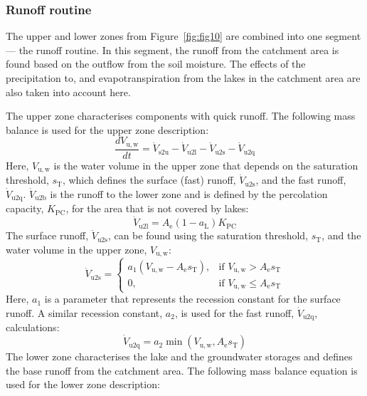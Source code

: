 \documentclass[%
]{USN-PhD}
\begin{document}
\subsubsection{Runoff routine}

The upper and lower zones from Figure~\ref{fig:fig10} are combined into one segment --- the runoff routine. In this segment, the runoff from the catchment area is found based on the outflow from the soil moisture. The effects of the precipitation to, and evapotranspiration from the lakes in the catchment area are also taken into account here.

The upper zone characterises components with quick runoff. The following mass balance is used for the upper zone description:
\begin{equation}\label{eq:eq28}
\frac{dV_\mathrm{u,w}}{dt}=\dot{V}_\mathrm{s2u}-\dot{V}_\mathrm{u2l}-\dot{V}_\mathrm{u2s}-\dot{V}_\mathrm{u2q}
\end{equation}
Here, $V_\mathrm{u,w}$ is the water volume in the upper zone that depends on the saturation threshold, $s_\mathrm{T}$, which defines the surface (fast) runoff, $\dot{V}_\mathrm{u2s}$, and the fast runoff, $\dot{V}_\mathrm{u2q}$. $\dot{V}_\mathrm{u2b}$ is the runoff to the lower zone and is defined by the percolation capacity, $K_\mathrm{PC}$, for the area that is not covered by lakes:
\begin{equation}\label{eq:eq29}
\dot{V}_\mathrm{u2l}=A_\mathrm{e}(1-a_\mathrm{L})K_\mathrm{PC}
\end{equation}
The surface runoff, $\dot{V}_\mathrm{u2s}$, can be found using the saturation threshold, $s_\mathrm{T}$, and the water volume in the upper zone, $V_\mathrm{u,w}$:
\begin{equation}\label{eq:eq30}
\dot{V}_\mathrm{u2s}=\begin{cases} a_1(V_\mathrm{u,w}-A_\mathrm{e}s_\mathrm{T}), & \mbox{if } V_\mathrm{u,w}>A_\mathrm{e}s_\mathrm{T}\\ 0, & \mbox{if } V_\mathrm{u,w}\leq A_\mathrm{e}s_\mathrm{T} \end{cases}
\end{equation}
Here, $a_1$ is a parameter that represents the recession constant for the surface runoff. A similar recession constant, $a_2$, is used for the fast runoff, $\dot{V}_\mathrm{u2q}$, calculations:
\begin{equation}\label{eq:eq31}
\dot{V}_\mathrm{u2q}=a_2\min{(V_\mathrm{u,w},A_\mathrm{e}s_\mathrm{T})}
\end{equation}
The lower zone characterises the lake and the groundwater storages and defines the base runoff from the catchment area. The following mass balance equation is used for the lower zone description:
\end{document}
